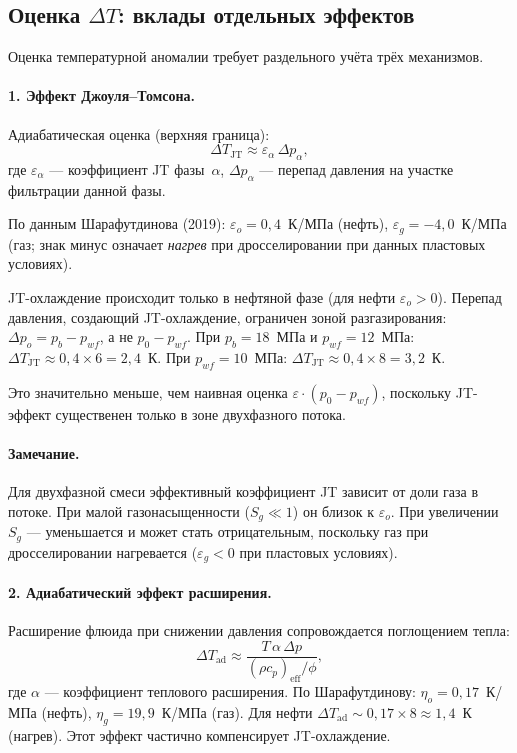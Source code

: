 ﻿\documentclass[12pt,a4paper]{article}
\begin{document}
\subsection{Оценка $\Delta T$: вклады отдельных эффектов}
\label{ssec:DT_estimate}

Оценка температурной аномалии требует раздельного учёта
трёх механизмов.

\paragraph{1. Эффект Джоуля--Томсона.}
Адиабатическая оценка (верхняя граница):
\begin{equation}\label{eq:DT_JT}
  \Delta T_{\mathrm{JT}} \approx \varepsilon_\alpha\,\Delta p_\alpha,
\end{equation}
где $\varepsilon_\alpha$ --- коэффициент JT фазы~$\alpha$,
$\Delta p_\alpha$ --- перепад давления на участке фильтрации
данной фазы.

По данным Шарафутдинова (2019):
$\varepsilon_o = 0{,}4$~К/МПа (нефть),
$\varepsilon_g = -4{,}0$~К/МПа (газ; знак минус означает
\emph{нагрев} при дросселировании при данных пластовых условиях).

JT-охлаждение происходит только в нефтяной фазе
(для нефти $\varepsilon_o > 0$). Перепад давления, создающий
JT-охлаждение, ограничен зоной разгазирования: $\Delta p_o
= p_b - p_{wf}$, а не $p_0 - p_{wf}$. При $p_b = 18$~МПа
и $p_{wf} = 12$~МПа: $\Delta T_{\mathrm{JT}} \approx 0{,}4
\times 6 = 2{,}4$~К. При $p_{wf} = 10$~МПа:
$\Delta T_{\mathrm{JT}} \approx 0{,}4 \times 8 = 3{,}2$~К.

Это значительно меньше, чем наивная оценка
$\varepsilon \cdot (p_0 - p_{wf})$, поскольку JT-эффект
существенен только в зоне двухфазного потока.

\paragraph{Замечание.}
Для двухфазной смеси эффективный коэффициент JT зависит
от доли газа в потоке. При малой газонасыщенности
($S_g \ll 1$) он близок к $\varepsilon_o$. При увеличении
$S_g$ --- уменьшается и может стать отрицательным,
поскольку газ при дросселировании нагревается
($\varepsilon_g < 0$ при пластовых условиях).

\paragraph{2. Адиабатический эффект расширения.}
Расширение флюида при снижении давления сопровождается
поглощением тепла:
\begin{equation}\label{eq:DT_ad}
  \Delta T_{\mathrm{ad}} \approx
  \frac{T\,\alpha\,\Delta p}{(\rho c_p)_{\mathrm{eff}}/\phi},
\end{equation}
где $\alpha$ --- коэффициент теплового расширения.
По Шарафутдинову: $\eta_o = 0{,}17$~К/МПа (нефть),
$\eta_g = 19{,}9$~К/МПа (газ). Для нефти
$\Delta T_{\mathrm{ad}} \sim 0{,}17 \times 8 \approx 1{,}4$~К
(нагрев). Этот эффект частично компенсирует JT-охлаждение.
\end{document}
